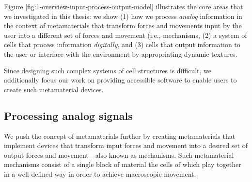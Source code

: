Figure \ref{fig:1-overview-input-process-output-model} illustrates the core areas that we investigated in this thesis: we show (1) how we process \textit{analog} information in the context of metamaterials that transform forces and movements input by the user into a different set of forces and movement (i.e., mechanisms, (2) a system of cells that process information \textit{digitally}, and (3) cells that output information to the user or interface with the environment by appropriating dynamic textures.

Since designing such complex systems of cell structures is difficult, we additionally focus our work on providing accessible software to enable users to create such metamaterial devices.

    
    




\subsection{Processing analog signals}
We push the concept of metamaterials further by creating metamaterials that implement devices that transform input forces and movement into a desired set of output forces and movement---also known as mechanisms. Such metamaterial mechanisms consist of a single block of material the cells of which play together in a well-defined way in order to achieve macroscopic movement.

